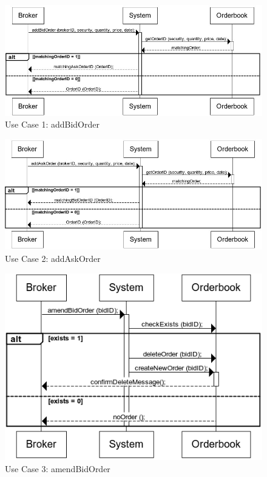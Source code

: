 \documentclass[a4paper]{article}
\begin{document}
\begin{figure}[H] 
   \includegraphics[width=1\textwidth]{images/addBidOrder}
   \caption{Use Case 1: addBidOrder}
\end{figure}

\begin{figure}[H]
   \includegraphics[width=1\textwidth]{images/addAskOrder}
   \caption{Use Case 2: addAskOrder}
\end{figure}

\begin{figure}[H]
   \includegraphics[width=1\textwidth]{images/amendBidOrder}
    \caption{Use Case 3: amendBidOrder}
\end{figure}
\end{document}
